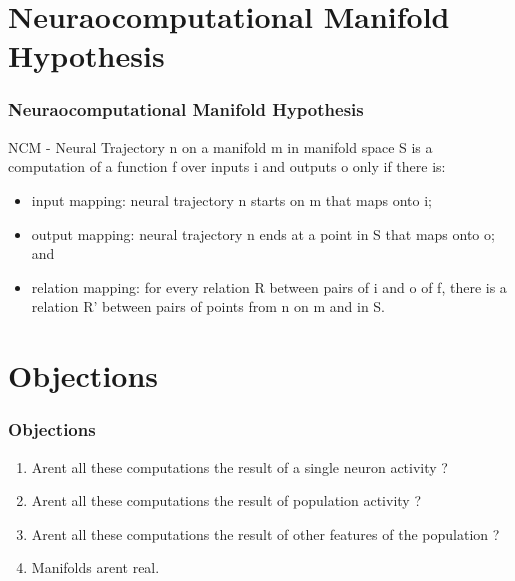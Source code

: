 \documentclass{beamer}
\begin{document}
\section{Neuraocomputational Manifold Hypothesis}
\begin{frame}
\frametitle{\textbf{Neuraocomputational Manifold Hypothesis} }

NCM - Neural Trajectory n on a manifold m in manifold space S is a computation of a function f over inputs i and outputs o only if there is:

\begin{itemize}
    \item input mapping: neural trajectory n starts on m that maps onto i;
    \item output mapping: neural trajectory n ends at a point in S that maps onto o; and
    \item relation mapping: for every relation R between pairs of i and o of f, there is a relation R' between pairs of points from n on m and in S.
\end{itemize}


\end{frame}


\section{Objections}
\begin{frame}
\frametitle{\textbf{Objections} }

\begin{enumerate}
    \item Arent all these computations the result of a single neuron activity ?
    \item Arent all these computations the result of population activity ?
    \item Arent all these computations the result of other features of the population ?
    \item Manifolds arent real.
\end{enumerate}


\end{frame}
\end{document}
